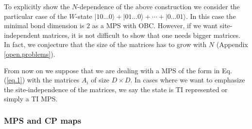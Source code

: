 \documentclass[aps,prl,epsfig,graphics,floatfix,mathbbm,a4paper]{article}
\newcommand{\1}{\mathbbm{1}}
\renewcommand{\>}{\rangle}
\newcommand{\<}{\langle}
\begin{document}



To explicitly show the $N$-dependence of the above construction we
consider the particular case of the $W$-state
$|10\ldots0\>+|01\ldots 0\> +\cdots+|0\ldots 01\>$. In this case
the minimal bond dimension is $2$ as a MPS with OBC. However, if
we want site-independent matrices, it is not difficult to show
that one needs bigger matrices. In fact, we conjecture that the
size of the matrices has to grow with $N$ (Appendix
\ref{open.problems}).


From now on we suppose that we are dealing with a MPS of the form
in Eq.(\ref{eq.1})
with the matrices $A_i$ of size $D\times D$. In cases where we
want to emphasize the site-independence of the matrices, we say
the state is TI represented or simply a  TI MPS.


\subsubsection{MPS and CP maps}
\end{document}
